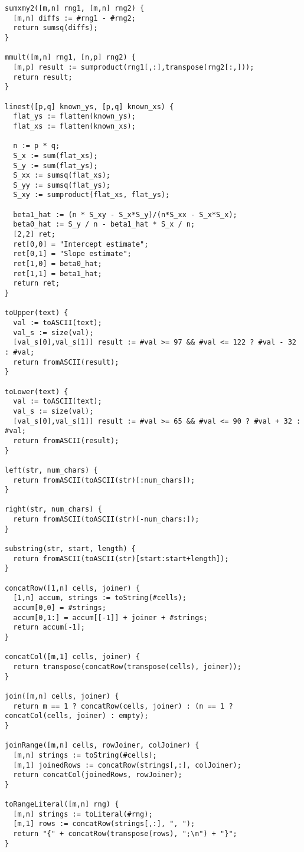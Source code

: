 \begin{lstlisting}
sumxmy2([m,n] rng1, [m,n] rng2) {
  [m,n] diffs := #rng1 - #rng2;
  return sumsq(diffs);
}

mmult([m,n] rng1, [n,p] rng2) {
  [m,p] result := sumproduct(rng1[,:],transpose(rng2[:,]));
  return result;
}

linest([p,q] known_ys, [p,q] known_xs) {
  flat_ys := flatten(known_ys);
  flat_xs := flatten(known_xs);

  n := p * q;
  S_x := sum(flat_xs);
  S_y := sum(flat_ys);
  S_xx := sumsq(flat_xs);
  S_yy := sumsq(flat_ys);
  S_xy := sumproduct(flat_xs, flat_ys);

  beta1_hat := (n * S_xy - S_x*S_y)/(n*S_xx - S_x*S_x);
  beta0_hat := S_y / n - beta1_hat * S_x / n;
  [2,2] ret;
  ret[0,0] = "Intercept estimate";
  ret[0,1] = "Slope estimate";
  ret[1,0] = beta0_hat;
  ret[1,1] = beta1_hat;
  return ret;
}

toUpper(text) {
  val := toASCII(text);
  val_s := size(val);
  [val_s[0],val_s[1]] result := #val >= 97 && #val <= 122 ? #val - 32 : #val;
  return fromASCII(result);
}

toLower(text) {
  val := toASCII(text);
  val_s := size(val);
  [val_s[0],val_s[1]] result := #val >= 65 && #val <= 90 ? #val + 32 : #val;
  return fromASCII(result);
}

left(str, num_chars) {
  return fromASCII(toASCII(str)[:num_chars]);
}

right(str, num_chars) {
  return fromASCII(toASCII(str)[-num_chars:]);
}

substring(str, start, length) {
  return fromASCII(toASCII(str)[start:start+length]);
}

concatRow([1,n] cells, joiner) {
  [1,n] accum, strings := toString(#cells);
  accum[0,0] = #strings;
  accum[0,1:] = accum[[-1]] + joiner + #strings;
  return accum[-1];
}

concatCol([m,1] cells, joiner) {
  return transpose(concatRow(transpose(cells), joiner));
}

join([m,n] cells, joiner) {
  return m == 1 ? concatRow(cells, joiner) : (n == 1 ? concatCol(cells, joiner) : empty);
}

joinRange([m,n] cells, rowJoiner, colJoiner) {
  [m,n] strings := toString(#cells);
  [m,1] joinedRows := concatRow(strings[,:], colJoiner);
  return concatCol(joinedRows, rowJoiner);
}

toRangeLiteral([m,n] rng) {
  [m,n] strings := toLiteral(#rng);
  [m,1] rows := concatRow(strings[,:], ", ");
  return "{" + concatRow(transpose(rows), ";\n") + "}";
}


\end{lstlisting}
